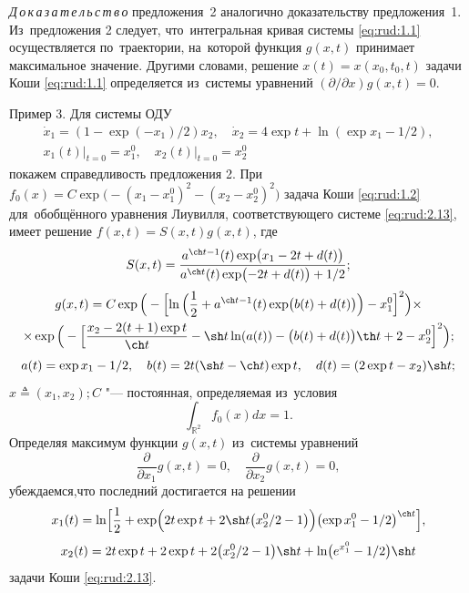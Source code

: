 \smallskip

\textit{Д\,о\,к\,а\,з\,а\,т\,е\,л\,ь\,с\,т\,в\,о} предложения~2 аналогично доказательству предложения~1. 
Из~предложения 2 следует, что~интегральная кривая системы \eqref{eq:rud:1.1} осуществляется по~траектории,
на~которой функция $g(x,t)$ принимает максимальное значение. 
Другими словами, решение $x(t)=x(x_0,t_0,t)$ задачи Коши \eqref{eq:rud:1.1} определяется из~системы уравнений
$({\partial}/{\partial x})g(x,t)=0$.

\smallskip

{\small\sc Пример 3.} Для системы ОДУ
\begin{equation}
\begin{array}{c}
\dot x_1=(1-\exp ({-x_1}) /2 )x_2, \quad  \dot x_2=4\exp t+\ln(\exp{x_1}-{1}/{2}), \\
x_1(t)\big|_{t=0}=x_1^0,\quad x_2(t)\big|_{t=0}=x_2^0
\end{array}
\label{eq:rud:2.13}
\end{equation}
покажем справедливость предложения 2. 
При  $f_0(x)=C\exp\bigl(-(x_1-x_1^0)^2-(x_2-x_2^0)^2\bigr)$ задача Коши \eqref{eq:rud:1.2} для~обобщённого уравнения Лиувилля, соответствующего системе \eqref{eq:rud:2.13}, имеет решение $f(x,t)=S(x,t) g(x,t)$,
где
$$
S(x,t)=\frac{a^{\ch t-1} (t) \exp\bigl(x_1-2t+d(t)\bigr)  } 
{{a }^{\ch t} (t) \exp\bigl({-2t+d(t)}\bigr)  +1/2};
$$
\begin{multline*}
g(x,t)=C\exp \Big(-\Bigl[\ln\Big(\frac12+a^{\ch t-1} (t) \exp\bigl(b(t)+d(t)\bigr)\Big)-x_1^0\Bigr]^2\Big)
\times \\
\times 
\exp\Big( -\Bigl[\frac{x_2-2(t+1) \exp t }{\ch t}-\sh t\ln(a(t))-  \bigl( b(t)+d(t) \bigr) \th t +2-x_2^0\Big]^2\Big);
\end{multline*}
$$a(t)=\exp {x_1}-1/2, \quad  b(t)=2t  (\sh t-\ch t) \exp t,\quad d(t)= (2\exp t-x_2) \sh t;$$ 
$x\triangleq (x_1,x_2); C$ "---
постоянная, определяемая из~условия $$\int _{\mathbb R^2}f_0(x)dx=1.$$ 
Определяя максимум функции $g(x,t)$ из~системы уравнений 
$$\frac{\partial}{\partial x_1}g(x,t)=0, \quad \frac{\partial}{\partial x_2}g(x,t)=0,$$ 
убеждаемся,что последний достигается на решении
$$
x_1(t)=\ln\Bigl[\frac12+\exp\Bigl(2t\exp t+2\sh t\bigl ({x_2^0}/{2}-1\bigr)\Bigr) \bigl (\exp {x_1^0}-1/2\bigr )^{\ch t}\Bigr],
$$
$$
x_2(t)=2t\exp t+2\exp t+2\bigl ({x_2^0}/{2}-1\bigr ) \sh t+  \ln\bigl (e^{x_1^0}-1/2\bigr ) \sh t
$$
задачи Коши \eqref{eq:rud:2.13}.

